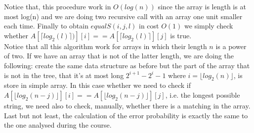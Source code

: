 \documentclass[a4paper]{article}
\begin{document}
Notice that, this procedure work in $O(log(n))$ since the array is length is at most log(n) and we are doing two recursive call with an array one unit smaller each time. Finally to obtain $equalS(i, j,\textit{l})$ in cost $O(1)$ we simply check whether $A[\lceil log_2(l) \rceil )][i]== A[\lceil log_2(l) \rceil ][j]$ is true. \\
Notice that all this algorithm work for arrays in which their length $n$ is a power of two. If we have an array that is not of the latter length, we are doing the following: create the same data structure as before but the part of the array that is not in the tree, that it's at most long $2^{i+1}-2^{i}-1$ where $i= \lfloor log_2(n)\rfloor$, is store in simple array. In this case whether we need to check if $A[\lfloor log_2(n-j)\rfloor][i]== A[\lfloor log_2(n-j)\rfloor][j]$, i.e. the longest possible string, we need also to check, manually, whether there is a matching in the array. Last but not least, the calculation of the error probability is exactly the same to the one analysed during the course.  
\end{document}
